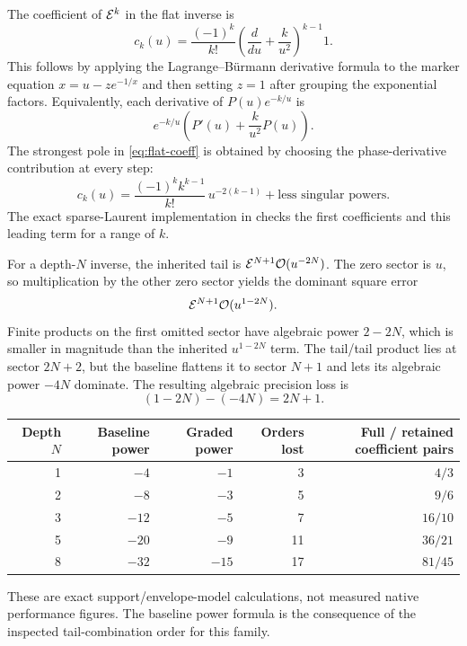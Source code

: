 The coefficient of $\mathcal{E}^k$ in the flat inverse is
\begin{equation}\label{eq:flat-coeff}
 c_k(u)=\frac{(-1)^k}{k!}
 \left(\frac{d}{du}+\frac{k}{u^2}\right)^{k-1}1.
\end{equation}
This follows by applying the Lagrange--B\"urmann derivative formula to the marker equation $x=u-z e^{-1/x}$ and then setting $z=1$ after grouping the exponential factors. Equivalently, each derivative of $P(u)e^{-k/u}$ is
\[
 e^{-k/u}\left(P'(u)+\frac{k}{u^2}P(u)\right).
\]
The strongest pole in \eqref{eq:flat-coeff} is obtained by choosing the phase-derivative contribution at every step:
\begin{equation}\label{eq:flat-leading}
 c_k(u)=\frac{(-1)^k k^{k-1}}{k!}\,u^{-2(k-1)}
        +\text{less singular powers}.
\end{equation}
The exact sparse-Laurent implementation in  checks the first coefficients and this leading term for a range of $k$.

For a depth-$N$ inverse, the inherited tail is $\mathcal{E}^{N+1}\mathcal{O}(u^{-2N})$. The zero sector is $u$, so multiplication by the other zero sector yields the dominant square error
\begin{equation}\label{eq:general-flat-sharp}
 \mathcal{E}^{N+1}\mathcal{O}(u^{1-2N}).
\end{equation}
Finite products on the first omitted sector have algebraic power $2-2N$, which is smaller in magnitude than the inherited $u^{1-2N}$ term. The tail/tail product lies at sector $2N+2$, but the baseline flattens it to sector $N+1$ and lets its algebraic power $-4N$ dominate. The resulting algebraic precision loss is
\begin{equation}
 (1-2N)-(-4N)=2N+1.
\end{equation}

\begin{center}
\begin{tabular}{@{}rrrrr@{}}\toprule
Depth $N$ & Baseline power & Graded power & Orders lost & Full / retained coefficient pairs\\\midrule
1 & $-4$ & $-1$ & 3 & $4/3$\\
2 & $-8$ & $-3$ & 5 & $9/6$\\
3 & $-12$ & $-5$ & 7 & $16/10$\\
5 & $-20$ & $-9$ & 11 & $36/21$\\
8 & $-32$ & $-15$ & 17 & $81/45$\\\bottomrule
\end{tabular}
\end{center}
These are exact support/envelope-model calculations, not measured native performance figures. The baseline power formula is the consequence of the inspected tail-combination order for this family.

